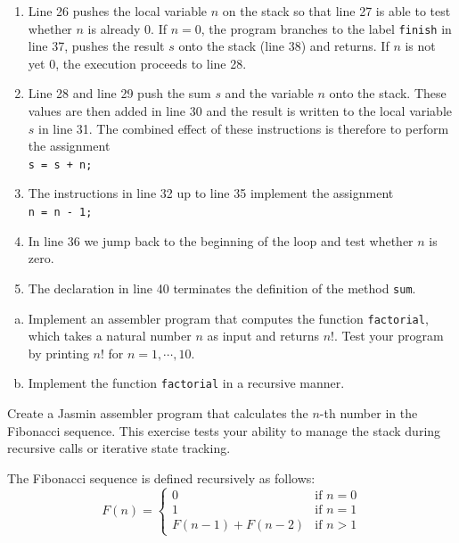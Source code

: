 \begin{enumerate}
\item Line 26 pushes the local variable $n$ on the stack so that line 27 is able to test whether $n$
      is already $0$.  If $n = 0$, the program branches to the label \texttt{finish} in line 37,
      pushes the result $s$ onto the stack (line 38) and returns.  If $n$ is not yet $0$, the
      execution proceeds to line 28.
\item Line 28 and line 29 push the sum $s$ and the variable $n$ onto the stack.  These
      values are then added in line 30 and the result is written to the local variable $s$ in line 31.
      The combined effect of these instructions is therefore to perform the assignment
      \\[0.2cm]
      \hspace*{1.3cm}
      \texttt{s = s + n;}
\item The instructions in line 32 up to line 35 implement the assignment 
      \\[0.2cm]
      \hspace*{1.3cm}
      \texttt{n = n - 1;}
\item In line 36 we jump back to the beginning of the loop and test whether $n$ is zero.  
\item The declaration in line 40 terminates the definition of the method \texttt{sum}.
\end{enumerate}

\exerciseEng
\begin{enumerate}[(a)]
\item Implement an assembler program that computes the function \texttt{factorial}, which takes a natural
      number $n$ as input and returns $n!$.  Test your program by printing
      $n!$ for $n = 1, \cdots, 10$.
\item Implement the function \texttt{factorial} in a recursive manner.
\end{enumerate}

\exerciseEng
Create a Jasmin assembler program that calculates the $n$-th number in the Fibonacci sequence.
This exercise tests your ability to manage the stack during recursive calls or iterative state tracking.

The Fibonacci sequence is defined recursively as follows:
\begin{equation*}
    F(n) = 
    \begin{cases} 
        0 & \text{if } n = 0 \\
        1 & \text{if } n = 1 \\
        F(n-1) + F(n-2) & \text{if } n > 1
    \end{cases}
\end{equation*}


